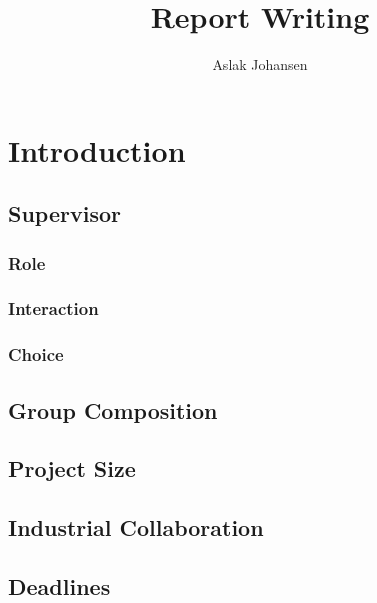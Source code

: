 \documentclass[a4paper]{memoir}
\title{Report Writing \\ \scalebox{0.85}{for Software BSc and MSc Projects}}
\author{Aslak Johansen}
\begin{document}
\maketitle
\tableofcontents

\chapter{Introduction}

\section{Supervisor}

\subsection{Role}

\subsection{Interaction}

\subsection{Choice}

\section{Group Composition}




\section{Project Size}
\label{sec:projectsize}

\section{Industrial Collaboration}

\section{Deadlines}
\end{document}
